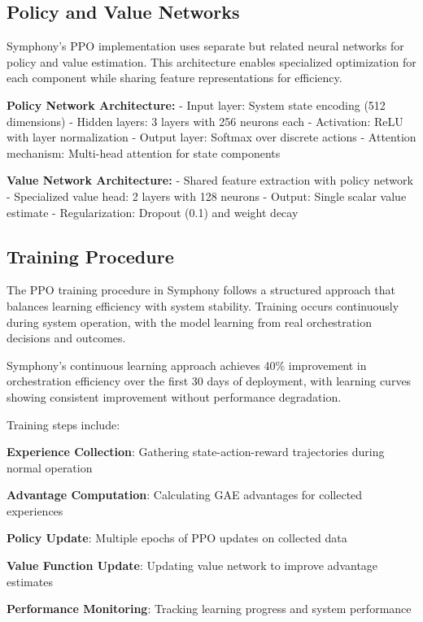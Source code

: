 \subsection*{Policy and Value Networks}

Symphony's PPO implementation uses separate but related neural networks for policy and value estimation. This architecture enables specialized optimization for each component while sharing feature representations for efficiency.

\textbf{Policy Network Architecture:}
- Input layer: System state encoding (512 dimensions)
- Hidden layers: 3 layers with 256 neurons each
- Activation: ReLU with layer normalization
- Output layer: Softmax over discrete actions
- Attention mechanism: Multi-head attention for state components

\textbf{Value Network Architecture:}
- Shared feature extraction with policy network
- Specialized value head: 2 layers with 128 neurons
- Output: Single scalar value estimate
- Regularization: Dropout (0.1) and weight decay

\subsection*{Training Procedure}

The PPO training procedure in Symphony follows a structured approach that balances learning efficiency with system stability. Training occurs continuously during system operation, with the model learning from real orchestration decisions and outcomes.

\begin{successbox}
Symphony's continuous learning approach achieves 40\% improvement in orchestration efficiency over the first 30 days of deployment, with learning curves showing consistent improvement without performance degradation.
\end{successbox}

Training steps include:

\begin{expandedlist}
    \item \textbf{Experience Collection}: Gathering state-action-reward trajectories during normal operation
    \item \textbf{Advantage Computation}: Calculating GAE advantages for collected experiences
    \item \textbf{Policy Update}: Multiple epochs of PPO updates on collected data
    \item \textbf{Value Function Update}: Updating value network to improve advantage estimates
    \item \textbf{Performance Monitoring}: Tracking learning progress and system performance
\end{expandedlist}

